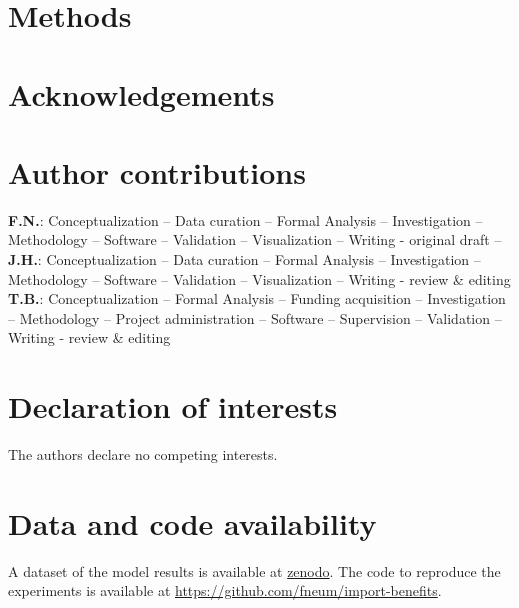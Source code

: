 \documentclass[5p,9pt]{elsarticle}
\renewcommand{\ttdefault}{\sfdefault}
\begin{document}


\section*{Methods}

\label{sec:methods}



\section*{Acknowledgements}



\section*{Author contributions}


\textbf{F.N.}:
Conceptualization --
Data curation --
Formal Analysis --
Investigation --
Methodology --
Software --
Validation --
Visualization --
Writing - original draft --
\textbf{J.H.}:
Conceptualization --
Data curation --
Formal Analysis --
Investigation --
Methodology --
Software --
Validation --
Visualization --
Writing - review \& editing
\textbf{T.B.}:
Conceptualization --
Formal Analysis --
Funding acquisition --
Investigation --
Methodology --
Project administration --
Software --
Supervision --
Validation --
Writing - review \& editing

\section*{Declaration of interests}

The authors declare no competing interests.

\section*{Data and code availability} 

A dataset of the model results is available at \url{zenodo}.
The code to reproduce the experiments is available at \url{https://github.com/fneum/import-benefits}.

\renewcommand{\ttdefault}{\sfdefault}
% 


\setcounter{LastMainFigure}{\value{figure}}
\end{document}
